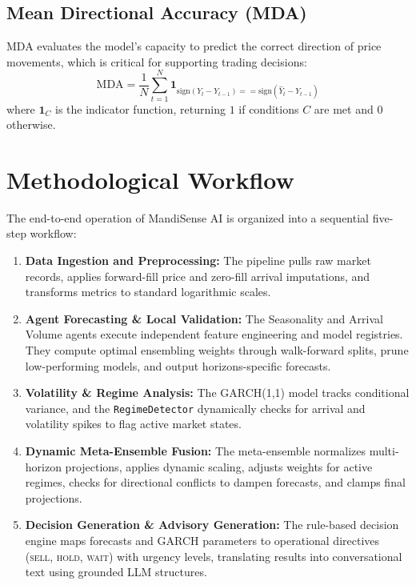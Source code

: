 \documentclass[12pt,a4paper]{report}
\theoremstyle{definition}
\theoremstyle{remark}
\begin{document}
\subsection{Mean Directional Accuracy (MDA)}
MDA evaluates the model's capacity to predict the correct direction of price movements, which is critical for supporting trading decisions:
\begin{equation}
    \text{MDA} = \frac{1}{N} \sum_{t=1}^N \mathbf{1}_{\text{sign}(Y_t - Y_{t-1}) == \text{sign}(\hat{Y}_t - Y_{t-1})}
\end{equation}
where $\mathbf{1}_{C}$ is the indicator function, returning $1$ if conditions $C$ are met and $0$ otherwise.

\section{Methodological Workflow}

The end-to-end operation of MandiSense AI is organized into a sequential five-step workflow:

\begin{enumerate}
    \item \textbf{Data Ingestion and Preprocessing:} The pipeline pulls raw market records, applies forward-fill price and zero-fill arrival imputations, and transforms metrics to standard logarithmic scales.
    \item \textbf{Agent Forecasting \& Local Validation:} The Seasonality and Arrival Volume agents execute independent feature engineering and model registries. They compute optimal ensembling weights through walk-forward splits, prune low-performing models, and output horizons-specific forecasts.
    \item \textbf{Volatility \& Regime Analysis:} The GARCH(1,1) model tracks conditional variance, and the \texttt{RegimeDetector} dynamically checks for arrival and volatility spikes to flag active market states.
    \item \textbf{Dynamic Meta-Ensemble Fusion:} The meta-ensemble normalizes multi-horizon projections, applies dynamic scaling, adjusts weights for active regimes, checks for directional conflicts to dampen forecasts, and clamps final projections.
    \item \textbf{Decision Generation \& Advisory Generation:} The rule-based decision engine maps forecasts and GARCH parameters to operational directives (\textsc{sell}, \textsc{hold}, \textsc{wait}) with urgency levels, translating results into conversational text using grounded LLM structures.
\end{enumerate}
\end{document}
